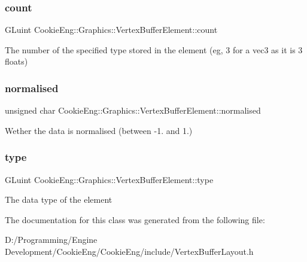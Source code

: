 \subsubsection{\texorpdfstring{count}{count}}
{\footnotesize\ttfamily G\+Luint Cookie\+Eng\+::\+Graphics\+::\+Vertex\+Buffer\+Element\+::count}

The number of the specified type stored in the element (eg, 3 for a vec3 as it is 3 floats) \mbox{\label{struct_cookie_eng_1_1_graphics_1_1_vertex_buffer_element_a1a50c45bd6f7e11f158b142ec20552ba}} 
\subsubsection{\texorpdfstring{normalised}{normalised}}
{\footnotesize\ttfamily unsigned char Cookie\+Eng\+::\+Graphics\+::\+Vertex\+Buffer\+Element\+::normalised}

Wether the data is normalised (between -\/1. and 1.) \mbox{\label{struct_cookie_eng_1_1_graphics_1_1_vertex_buffer_element_abba091f340c618809735781f80ccee6b}} 
\subsubsection{\texorpdfstring{type}{type}}
{\footnotesize\ttfamily G\+Luint Cookie\+Eng\+::\+Graphics\+::\+Vertex\+Buffer\+Element\+::type}

The data type of the element 

The documentation for this class was generated from the following file\+:\begin{DoxyCompactItemize}
\item 
D\+:/\+Programming/\+Engine Development/\+Cookie\+Eng/\+Cookie\+Eng/include/Vertex\+Buffer\+Layout.\+h\end{DoxyCompactItemize}
